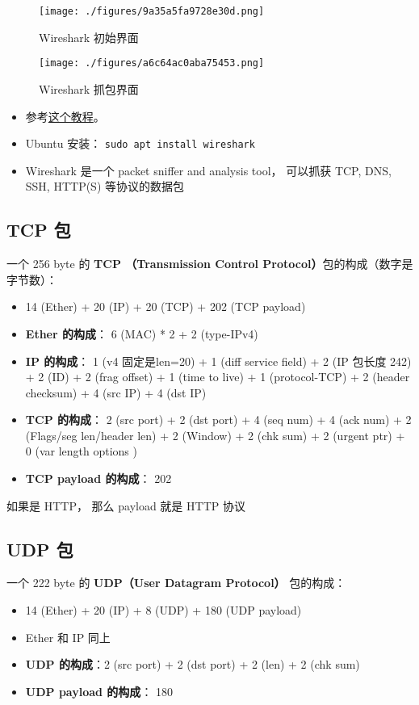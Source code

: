 
\begin{issues}
\issueDraft
\end{issues}

\begin{figure}[ht]
\centering
\texttt{[image: ./figures/9a35a5fa9728e30d.png]}
\caption{Wireshark 初始界面} \label{fig_wiresh_1}
\end{figure}

\begin{figure}[ht]
\centering
\texttt{[image: ./figures/a6c64ac0aba75453.png]}
\caption{Wireshark 抓包界面} \label{fig_wiresh_2}
\end{figure}


\begin{itemize}
\item 参考\href{https://www.varonis.com/blog/how-to-use-wireshark}{这个教程}。
\item Ubuntu 安装： \verb|sudo apt install wireshark|
\item Wireshark 是一个 packet sniffer and analysis tool， 可以抓获 TCP, DNS, SSH, HTTP(S)   等协议的数据包
\end{itemize}

\subsection{TCP 包}
一个 256 byte 的 \textbf{TCP （Transmission Control Protocol）}包的构成（数字是字节数）：
\begin{itemize}
\item 14 (Ether) + 20 (IP) + 20 (TCP) + 202 (TCP payload)
\item \textbf{Ether 的构成}： 6 (MAC) * 2 + 2 (type-IPv4)
\item \textbf{IP 的构成}： 1 (v4 固定是len=20) + 1 (diff service field) + 2 (IP 包长度 242) + 2 (ID) + 2 (frag offset) + 1 (time to live) + 1 (protocol-TCP) + 2 (header checksum) + 4 (src IP) + 4 (dst IP)
\item \textbf{TCP 的构成}： 2 (src port) + 2 (dst port) + 4 (seq num) + 4 (ack num) + 2 (Flags/seg len/header len) + 2 (Window) + 2 (chk sum) + 2 (urgent ptr) + 0 (var length options )
\item \textbf{TCP payload 的构成}： 202
\end{itemize}

如果是 HTTP， 那么 payload 就是 HTTP 协议


\subsection{UDP 包}
一个 222 byte 的 \textbf{UDP（User Datagram Protocol）} 包的构成：
\begin{itemize}
\item 14 (Ether) + 20 (IP) + 8 (UDP) + 180 (UDP payload)
\item Ether 和 IP 同上
\item \textbf{UDP 的构成}：2 (src port) + 2 (dst port) + 2 (len) + 2 (chk sum)
\item \textbf{UDP payload 的构成}： 180
\end{itemize}
